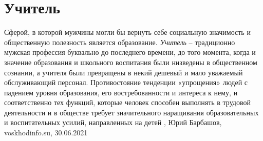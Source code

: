  
 
 
 
 
\chapter{Учитель}

Сферой, в которой мужчины могли бы вернуть себе социальную значимость и
общественную полезность является образование. \emph{Учитель} – традиционно
мужская профессия буквально до последнего времени, до того момента, когда и
значение образования и школьного воспитания были низведены в общественном
сознании, а учителя были превращены в некий дешевый и мало уважаемый
обслуживающий персонал.  Противостояние тенденции «упрощения» людей с падением
уровня образования, его востребованности и интереса к нему, и соответственно
тех функций, которые человек способен выполнять в трудовой деятельности и в
обществе требует значительного наращивания образовательных и воспитательных
усилий, направленных на детей
, 
Юрий Барбашов, voskhodinfo.su, 30.06.2021

